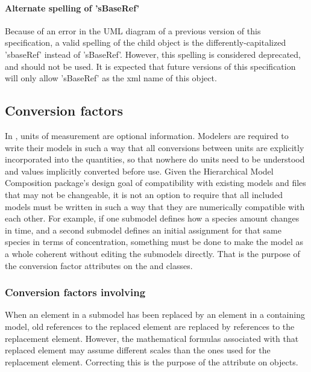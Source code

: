 \paragraph{Alternate spelling of 'sBaseRef'}
\label{sbaseref-deprecated-spelling}
Because of an error in the UML diagram of a previous version of this specification, a valid spelling of the child \SBaseRef object is the differently-capitalized 'sbaseRef' instead of 'sBaseRef'.  However, this spelling is considered deprecated, and should not be used.  It is expected that future versions of this specification will only allow 'sBaseRef' as the xml name of this object. 



\subsection{Conversion factors}
\label{conversion-factors}

In \sbmlthreecore, units of measurement are optional information.  Modelers are required to write their models in such a way that all conversions between units are explicitly incorporated into the quantities, so that nowhere do units need to be understood and values implicitly converted before use.  Given the Hierarchical Model Composition package's design goal of compatibility with existing models and files that may not be changeable, it is not an option to require that all included models must be written in such a way that they are numerically compatible with each other.  For example, if one submodel defines how a species amount changes in time, and a second submodel defines an initial assignment for that same species in terms of concentration, something must be done to make the model as a whole coherent without editing the submodels directly.  That is the purpose of the conversion factor attributes on the \ReplacedElement and \Submodel classes.


\subsubsection{Conversion factors involving }

When an element in a submodel has been replaced by an element in a containing model, old references to the replaced element are replaced by references to the replacement element.  However, the mathematical formulas associated with that replaced element may assume different scales than the ones used for the replacement element.  Correcting this is the purpose of the  attribute on \ReplacedElement objects.


